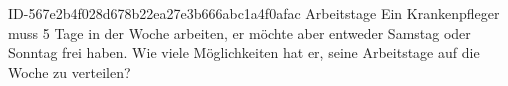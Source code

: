 \begin{exercise}
      {ID-567e2b4f028d678b22ea27e3b666abc1a4f0afac}
      {Arbeitstage}
  \ifproblem\problem
    Ein Krankenpfleger muss 5 Tage in der Woche arbeiten, er möchte aber
    entweder Samstag oder Sonntag frei haben. Wie viele Möglichkeiten hat
    er, seine Arbeitstage auf die Woche zu verteilen?
  \fi
\end{exercise}
